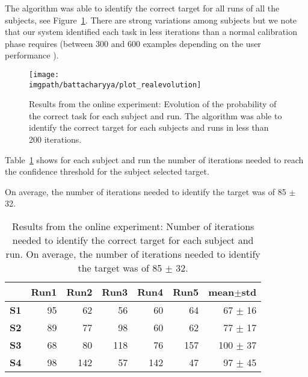 The algorithm was able to identify the correct target for all runs of all the subjects, see Figure~\ref{fig:online_results}. There are strong variations among subjects but we note that our system identified each task in less iterations than a normal calibration phase requires (between 300 and 600 examples depending on the user performance \cite{chavarriaga2010learning,iturrate2010single}).

\begin{figure}[!htbp]
    \centering
    \texttt{[image: \\imgpath/battacharyya/plot\_realevolution]}    
    \caption{Results from the online experiment: Evolution of the probability of the correct task for each subject and run. The algorithm was able to identify the correct target for each subjects and runs in less than 200 iterations.}
    \label{fig:online_results} 
\end{figure}

Table~\ref{ch6tab:steps} shows for each subject and run the number of iterations needed to reach the confidence threshold for the subject selected target.

On average, the number of iterations needed to identify the target was of 85 $\pm$ 32.

\begin{table}[!ht]
\centering
\begin{footnotesize}
\begin{tabular}{r|rrrrr|r}
    & \textbf{Run1} & \textbf{Run2} & \textbf{Run3} & \textbf{Run4} & \textbf{Run5} & \textbf{mean$\pm$std} \\\hline
    \textbf{S1} & 95 & 62 & 56 & 60 & 64 & 67 $\pm$ 16 \\
    \textbf{S2} & 89 & 77 & 98 & 60 & 62  & 77 $\pm$ 17 \\
    \textbf{S3} & 68 & 80 & 118 & 76 & 157 & 100 $\pm$ 37 \\
    \textbf{S4} & 98 & 142 & 57 & 142 & 47 & 97 $\pm$ 45 \\
\end{tabular}
\end{footnotesize}
  \caption{Results from the online experiment: Number of iterations needed to identify the correct target for each subject and run. On average, the number of iterations needed to identify the target was of 85 $\pm$ 32.}
  \label{ch6tab:steps}
\end{table}

